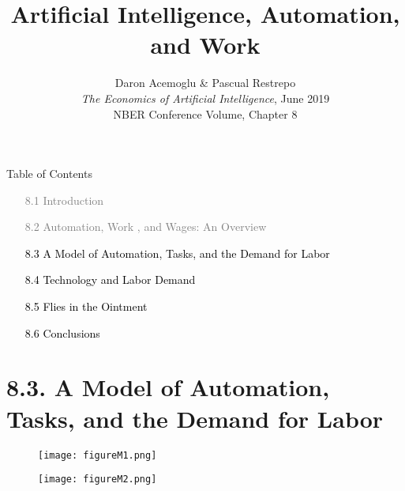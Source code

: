 \documentclass[notes=show]{beamer}
\begin{document}
\title{Artificial Intelligence, Automation, and Work}
\subtitle{}
\date{Daron Acemoglu \& Pascual Restrepo \bigskip \\
\textit{The Economics of Artificial Intelligence}, June 2019 \\
NBER Conference Volume, Chapter 8}
\author{}
\maketitle

\begin{frame}{Table of Contents}
\begin{itemize}
\item[\textcolor{gray}{8.1}] \textcolor{gray}{Introduction} \medskip
\item[\textcolor{gray}{8.2}] \textcolor{gray}{Automation, Work , and Wages: An Overview} \medskip
\item[\textcolor{black}{8.3}] \textcolor{black}{A Model of Automation, Tasks, and the Demand for Labor} \medskip
\item[\textcolor{black}{8.4}] \textcolor{black}{Technology and Labor Demand} \medskip
\item[\textcolor{black}{8.5}] \textcolor{black}{Flies in the Ointment} \medskip
\item[\textcolor{black}{8.6}] \textcolor{black}{Conclusions}
\end{itemize}
\end{frame}

\section{8.3. A Model of Automation, Tasks, and the Demand for Labor}

\newpage
\begin{center}
\begin{figure}
\texttt{[image: figureM1.png]} 
\end{figure}
\end{center}
\newpage

\newpage
\begin{center}
\begin{figure}
\texttt{[image: figureM2.png]}
\end{figure}
\end{center}
\newpage
\end{document}
